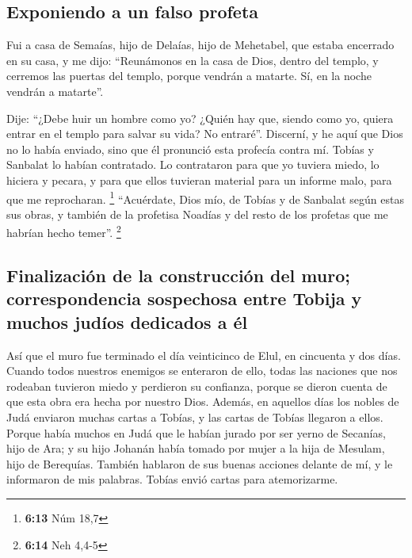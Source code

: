 \begin{paracol}{2}
\hypertarget{exponiendo-a-un-falso-profeta}{%
\subsection{Exponiendo a un falso
profeta}\label{exponiendo-a-un-falso-profeta}}

 Fui a casa de Semaías, hijo de Delaías, hijo de
Mehetabel, que estaba encerrado en su casa, y me dijo: ``Reunámonos en
la casa de Dios, dentro del templo, y cerremos las puertas del templo,
porque vendrán a matarte. Sí, en la noche vendrán a matarte''.

 Dije: ``¿Debe huir un hombre como yo? ¿Quién hay que,
siendo como yo, quiera entrar en el templo para salvar su vida? No
entraré''.  Discerní, y he aquí que Dios no lo había
enviado, sino que él pronunció esta profecía contra mí. Tobías y
Sanbalat lo habían contratado.  Lo contrataron para que
yo tuviera miedo, lo hiciera y pecara, y para que ellos tuvieran
material para un informe malo, para que me reprocharan. \footnote{\textbf{6:13}
  Núm 18,7}  ``Acuérdate, Dios mío, de Tobías y de
Sanbalat según estas sus obras, y también de la profetisa Noadías y del
resto de los profetas que me habrían hecho temer''. \footnote{\textbf{6:14}
  Neh 4,4-5}

\hypertarget{finalizaciuxf3n-de-la-construcciuxf3n-del-muro-correspondencia-sospechosa-entre-tobija-y-muchos-juduxedos-dedicados-a-uxe9l}{%
\subsection{Finalización de la construcción del muro; correspondencia
sospechosa entre Tobija y muchos judíos dedicados a
él}\label{finalizaciuxf3n-de-la-construcciuxf3n-del-muro-correspondencia-sospechosa-entre-tobija-y-muchos-juduxedos-dedicados-a-uxe9l}}

 Así que el muro fue terminado el día veinticinco de
Elul, en cincuenta y dos días.  Cuando todos nuestros
enemigos se enteraron de ello, todas las naciones que nos rodeaban
tuvieron miedo y perdieron su confianza, porque se dieron cuenta de que
esta obra era hecha por nuestro Dios.  Además, en
aquellos días los nobles de Judá enviaron muchas cartas a Tobías, y las
cartas de Tobías llegaron a ellos.  Porque había muchos
en Judá que le habían jurado por ser yerno de Secanías, hijo de Ara; y
su hijo Johanán había tomado por mujer a la hija de Mesulam, hijo de
Berequías.  También hablaron de sus buenas acciones
delante de mí, y le informaron de mis palabras. Tobías envió cartas para
atemorizarme.


\end{paracol}
